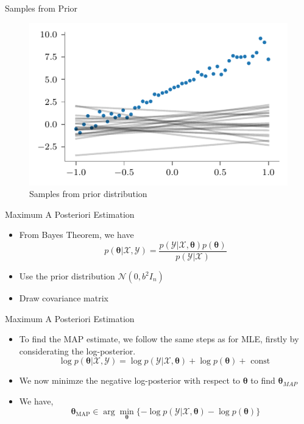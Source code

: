 \documentclass{beamer}
\begin{document}
\begin{frame}{Samples from Prior}
\begin{figure}
	\centering
	\includegraphics{../../notebooks/bayesian-linear-prior-samples}
	\caption{Samples from prior distribution}
	\label{fig:bayesian-linear-dataset}
\end{figure}
\end{frame}


\begin{frame}{Maximum A Posteriori Estimation}
\begin{itemize}[<+->]
\item From Bayes Theorem, we have 
\begin{equation*}
p(\boldsymbol{\theta} | \mathcal{X}, \mathcal{Y})=\frac{p(\mathcal{Y} | \mathcal{X}, \boldsymbol{\theta}) p(\boldsymbol{\theta})}{p(\mathcal{Y} | \mathcal{X})}
\end{equation*}
\item Use the prior distribution $\mathcal{N}(0, b^{2} I_{n})$
\item Draw covariance matrix
\end{itemize}


\end{frame}
\begin{frame}{Maximum A Posteriori Estimation}
\begin{itemize}[<+->]
\item To find the MAP estimate, we follow the same steps as for MLE, firstly by considerating the log-posterior.
\begin{equation*}
\log p(\boldsymbol{\theta} | \mathcal{X, Y}) = \log p(\mathcal{Y | X}, \boldsymbol{\theta}) + \log p(\boldsymbol{\theta}) + \text{ const }
\end{equation*}
\item We now minimze the negative log-posterior with respect to $\boldsymbol{\theta}$ to find $\boldsymbol{\theta}_{MAP}$
\item We have, 
\begin{equation*}
\boldsymbol{\theta}_{\mathrm{MAP}} \in \arg \min _{\boldsymbol{\theta}}\{-\log p(\mathcal{Y} | \mathcal { X }, \boldsymbol{\theta})-\log p(\boldsymbol{\theta})\}
\end{equation*}
\end{itemize}


\end{frame}
\end{document}
